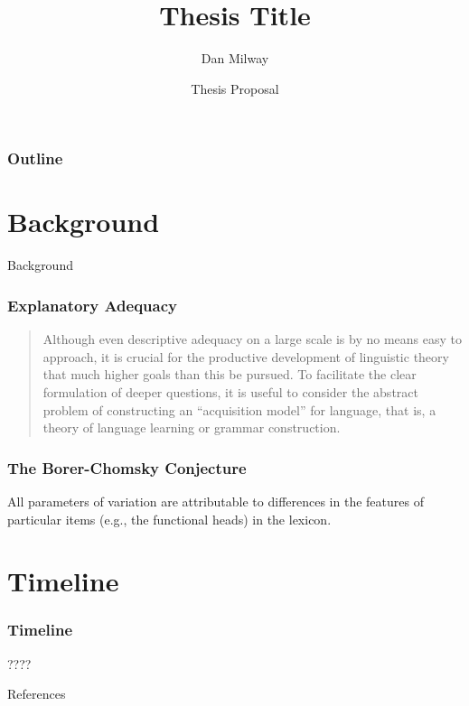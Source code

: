 \documentclass{beamer}
\title{Thesis Title}
\date[Proposal]{Thesis Proposal}
\author[Milway]{Dan Milway}
\begin{document}
\begin{frame}
	\titlepage
\end{frame}
\begin{frame}
	\frametitle{Outline}
	\tableofcontents
\end{frame}
\section{Background}
\begin{frame}{Background}
	\frametitle{Explanatory Adequacy}
	\begin{quote}
		Although even descriptive adequacy on a large scale is by no means easy to approach, it is crucial for the productive development of linguistic theory that much higher goals than this be pursued. 
		To facilitate the clear formulation of deeper questions, it is useful to consider the abstract problem of constructing an “acquisition model” for language, that is, a theory of language learning or grammar construction.
		\parencite[pp.24-25]{chomsky1965aspects}
	\end{quote}
\end{frame}
\begin{frame}
  \frametitle{The Borer-Chomsky Conjecture}
  All parameters of variation are attributable to differences in the features of particular items (e.g., the functional heads) in the lexicon.
  \textcite{baker2008microparameter}
\end{frame}
\section{Timeline}
\begin{frame}
	\frametitle{Timeline}
	????
\end{frame}
\begin{frame}{References}
	\printbibliography
\end{frame}
\end{document}

